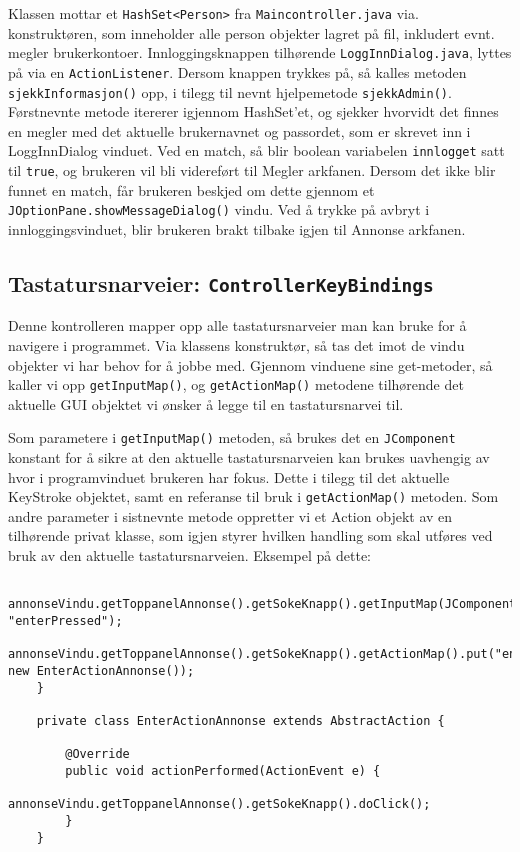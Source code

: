 Klassen mottar et \texttt{HashSet<Person>} fra \texttt{Maincontroller.java} via. konstruktøren, som inneholder alle person objekter lagret på fil, inkludert evnt. megler brukerkontoer. Innloggingsknappen tilhørende \texttt{LoggInnDialog.java}, lyttes på via en \texttt{ActionListener}. Dersom knappen trykkes på, så kalles metoden \texttt{sjekkInformasjon()} opp, i tilegg til nevnt hjelpemetode \texttt{sjekkAdmin()}. 
Førstnevnte metode itererer igjennom HashSet'et, og sjekker hvorvidt det finnes en megler med det aktuelle brukernavnet og passordet, som er skrevet inn i LoggInnDialog vinduet. Ved en match, så blir boolean variabelen \texttt{innlogget} satt til \texttt{true}, og brukeren vil bli videreført til Megler arkfanen. Dersom det ikke blir funnet en match, får brukeren beskjed om dette gjennom et \texttt{JOptionPane.showMessageDialog()} vindu. Ved å trykke på avbryt i innloggingsvinduet, blir brukeren brakt tilbake igjen til Annonse arkfanen. 

\subsection{Tastatursnarveier: \texttt{ControllerKeyBindings}}
Denne kontrolleren mapper opp alle tastatursnarveier man kan bruke for å navigere i programmet. Via klassens konstruktør, så tas det imot de vindu objekter vi har behov for å jobbe med.
Gjennom vinduene sine get-metoder, så kaller vi opp \texttt{getInputMap()}, og \texttt{getActionMap()} metodene tilhørende det aktuelle GUI objektet vi ønsker å legge til en tastatursnarvei til. 

Som parametere i \texttt{getInputMap()} metoden, så brukes det en \texttt{JComponent} konstant for å sikre at den aktuelle tastatursnarveien kan brukes uavhengig av hvor i programvinduet brukeren har fokus. Dette i tilegg til det aktuelle KeyStroke objektet, samt en referanse til bruk i \texttt{getActionMap()} metoden. Som andre parameter i sistnevnte metode oppretter vi et Action objekt av en tilhørende privat klasse, som igjen styrer hvilken handling som skal utføres ved bruk av den aktuelle tastatursnarveien. Eksempel på dette:

\begin{lstlisting}
        annonseVindu.getToppanelAnnonse().getSokeKnapp().getInputMap(JComponent.WHEN_IN_FOCUSED_WINDOW).put(KeyStroke.getKeyStroke("ENTER"), "enterPressed");
        annonseVindu.getToppanelAnnonse().getSokeKnapp().getActionMap().put("enterPressed", new EnterActionAnnonse());
    }

    private class EnterActionAnnonse extends AbstractAction {

        @Override
        public void actionPerformed(ActionEvent e) {
            annonseVindu.getToppanelAnnonse().getSokeKnapp().doClick();
        }
    }
\end{lstlisting}    



